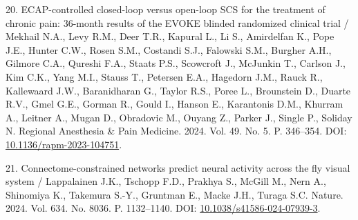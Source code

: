 \documentclass[12pt,a4paper]{article}
\begin{document}
\noindent\foreignlanguage{english}{20. ECAP-controlled closed-loop versus open-loop SCS for the treatment of chronic pain: 36-month results of the EVOKE blinded randomized clinical trial / Mekhail N.A., Levy R.M., Deer T.R., Kapural L., Li S., Amirdelfan K., Pope J.E., Hunter C.W., Rosen S.M., Costandi S.J., Falowski S.M., Burgher A.H., Gilmore C.A., Qureshi F.A., Staats P.S., Scowcroft J., McJunkin T., Carlson J., Kim C.K., Yang M.I., Stauss T., Petersen E.A., Hagedorn J.M., Rauck R., Kallewaard J.W., Baranidharan G., Taylor R.S., Poree L., Brounstein D., Duarte R.V., Gmel G.E., Gorman R., Gould I., Hanson E., Karantonis D.M., Khurram A., Leitner A., Mugan D., Obradovic M., Ouyang Z., Parker J., Single P., Soliday N. Regional Anesthesia \& Pain Medicine. 2024. Vol. 49. No. 5. P. 346–354. DOI: \url{10.1136/rapm-2023-104751}.}\par
\noindent\foreignlanguage{english}{21. Connectome-constrained networks predict neural activity across the fly visual system / Lappalainen J.K., Tschopp F.D., Prakhya S., McGill M., Nern A., Shinomiya K., Takemura S.-Y., Gruntman E., Macke J.H., Turaga S.C. Nature. 2024. Vol. 634. No. 8036. P. 1132–1140. DOI: \url{10.1038/s41586-024-07939-3}.}\par
\end{document}
